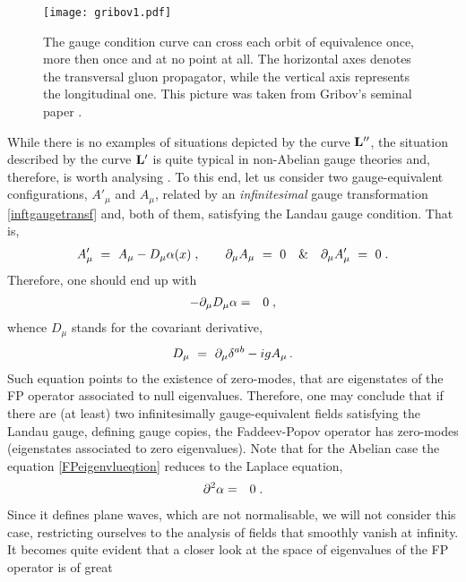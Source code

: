 \begin{figure}[h]
\begin{center}
\texttt{[image: gribov1.pdf]}
\caption{The gauge condition curve can cross each orbit of equivalence once, more then once and
at no point at all. The horizontal axes denotes the transversal gluon propagator, while the
vertical axis represents the longitudinal one. This picture was taken from Gribov's
seminal paper \cite{Gribov:1977wm}.}
\label{2fig1}
\end{center}
\end{figure}


While there is no examples of situations depicted by the curve $\bf L''$, the
situation described by the curve $\bf L'$ is quite typical in non-Abelian gauge theories and,
therefore, is worth analysing \cite{Gribov:1977wm,Sobreiro:2005ec,Vandersickel:2012tz,Dudal:2009bf}. To
this end, let us consider two gauge-equivalent configurations, $A'_{\mu}$ and $A_{\mu}$,
related by an {\it infinitesimal} gauge transformation \eqref{inftgaugetransf} and, both of
them, satisfying the Landau gauge condition. That is,
\begin{eqnarray}
A'_{\mu} ~=~ A_{\mu} - D_{\mu}\alpha(x)\;,  \qquad  \partial_\mu A_\mu ~=~ 0 \quad \& \quad  \partial_\mu A_\mu' ~=~ 0 \;.
\end{eqnarray}
Therefore, one should end up with
\begin{eqnarray}
- \partial_\mu D_\mu \alpha &=& 0\;,
\label{FPeigenvlueqtion}
\end{eqnarray}
whence $D_{\mu}$ stands for the covariant derivative,
\begin{eqnarray}
D_{\mu} ~=~ \partial_{\mu}\delta^{ab} - igA_{\mu}\,.
\end{eqnarray}
Such equation points to the existence of zero-modes, that are eigenstates of the FP operator
associated to null eigenvalues. Therefore, one may conclude that if there are (at least) two
infinitesimally gauge-equivalent fields satisfying the Landau gauge, defining gauge copies, the
Faddeev-Popov operator has zero-modes (eigenstates associated to zero eigenvalues). Note that
for the Abelian case the equation \eqref{FPeigenvlueqtion} reduces to the Laplace equation,
\begin{eqnarray}
\partial^{2} \alpha &=& 0\;.
\label{abelianeingvalue}
\end{eqnarray}
Since it defines plane waves, which are not normalisable, we will not consider this case,
restricting ourselves to the analysis of fields that smoothly vanish at infinity. It becomes 
quite evident that a closer look at the space of eigenvalues of the FP operator is of great

